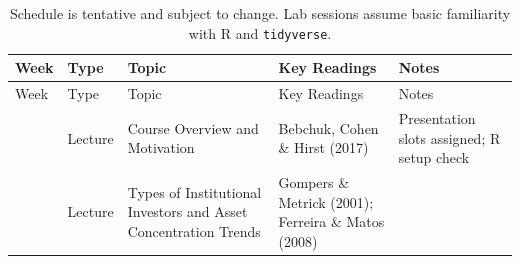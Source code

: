 \documentclass[
  12pt,
  letterpaper,
  DIV=11,
  numbers=noendperiod]{scrartcl}
\begin{document}
\begin{longtable}[]{@{}
  >{\raggedright\arraybackslash}p{}
  >{\raggedright\arraybackslash}p{}
  >{\raggedright\arraybackslash}p{}
  >{\raggedright\arraybackslash}p{}
  >{\raggedright\arraybackslash}p{}@{}}
\caption{Schedule is tentative and subject to change. Lab sessions
assume basic familiarity with R and
\protect\texttt{tidyverse}.}\tabularnewline
\toprule\noalign{}
\begin{minipage}[b]{\linewidth}\raggedright
Week
\end{minipage} & \begin{minipage}[b]{\linewidth}\raggedright
Type
\end{minipage} & \begin{minipage}[b]{\linewidth}\raggedright
Topic
\end{minipage} & \begin{minipage}[b]{\linewidth}\raggedright
Key Readings
\end{minipage} & \begin{minipage}[b]{\linewidth}\raggedright
Notes
\end{minipage} \\
\midrule\noalign{}
\endfirsthead
\toprule\noalign{}
\begin{minipage}[b]{\linewidth}\raggedright
Week
\end{minipage} & \begin{minipage}[b]{\linewidth}\raggedright
Type
\end{minipage} & \begin{minipage}[b]{\linewidth}\raggedright
Topic
\end{minipage} & \begin{minipage}[b]{\linewidth}\raggedright
Key Readings
\end{minipage} & \begin{minipage}[b]{\linewidth}\raggedright
Notes
\end{minipage} \\
\midrule\noalign{}
\endhead
\bottomrule\noalign{}
\endlastfoot
1 & Lecture & Course Overview and Motivation & Bebchuk, Cohen \& Hirst
(2017) & Presentation slots assigned; R setup check \\
2 & Lecture & Types of Institutional Investors and Asset Concentration
Trends & Gompers \& Metrick (2001); Ferreira \& Matos (2008) &

\end{longtable}
\end{document}
